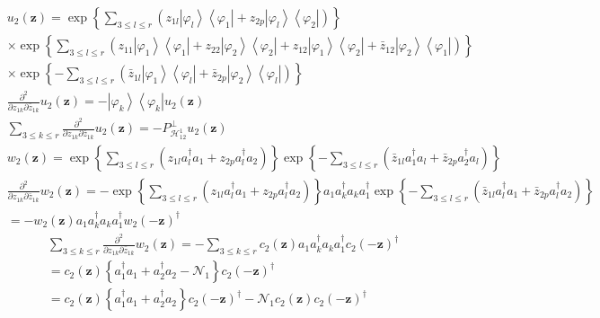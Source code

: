 \documentclass[aps,preprint]{revtex4}%
\begin{document}
\begin{align}
& u_{2}\left(  \mathbf{z}\right)  =\exp\left\{  \sum_{3\leq l\leq r}\left(
z_{1l}\left\vert \varphi_{l}\right\rangle \left\langle \varphi_{1}\right\vert
+z_{2p}\left\vert \varphi_{l}\right\rangle \left\langle \varphi_{2}\right\vert
\right)  \right\}  \\
& \times\exp\left\{  \sum_{3\leq l\leq r}\left(  z_{11}\left\vert \varphi
_{1}\right\rangle \left\langle \varphi_{1}\right\vert +z_{22}\left\vert
\varphi_{2}\right\rangle \left\langle \varphi_{2}\right\vert +z_{12}\left\vert
\varphi_{1}\right\rangle \left\langle \varphi_{2}\right\vert +\bar{z}%
_{12}\left\vert \varphi_{2}\right\rangle \left\langle \varphi_{1}\right\vert
\right)  \right\}  \\
& \times\exp\left\{  -\sum_{3\leq l\leq r}\left(  \bar{z}_{1l}\left\vert
\varphi_{1}\right\rangle \left\langle \varphi_{l}\right\vert +\bar{z}%
_{2p}\left\vert \varphi_{2}\right\rangle \left\langle \varphi_{l}\right\vert
\right)  \right\}  \\
& \frac{\partial^{2}}{\partial z_{1k}\partial\bar{z}_{1k}}u_{2}\left(
\mathbf{z}\right)  =-\left\vert \varphi_{k}\right\rangle \left\langle
\varphi_{k}\right\vert u_{2}\left(  \mathbf{z}\right)  \\
& \sum_{3\leq k\leq r}\frac{\partial^{2}}{\partial z_{1k}\partial\bar{z}_{1k}%
}u_{2}\left(  \mathbf{z}\right)  =-P_{\mathcal{H}_{12}^{1}}^{\bot}u_{2}\left(
\mathbf{z}\right)
\end{align}%
\begin{align}
& w_{2}\left(  \mathbf{z}\right)  =\exp\left\{  \sum_{3\leq l\leq r}\left(
z_{1l}a_{l}^{\dagger}a_{1}+z_{2p}a_{l}^{\dagger}a_{2}\right)  \right\}
\exp\left\{  -\sum_{3\leq l\leq r}\left(  \bar{z}_{1l}a_{1}^{\dagger}%
a_{l}+\bar{z}_{2p}a_{2}^{\dagger}a_{l}\right)  \right\}  \\
& \frac{\partial^{2}}{\partial z_{1k}\partial\bar{z}_{1k}}w_{2}\left(
\mathbf{z}\right)  =-\exp\left\{  \sum_{3\leq l\leq r}\left(  z_{1l}%
a_{l}^{\dagger}a_{1}+z_{2p}a_{l}^{\dagger}a_{2}\right)  \right\}  a_{1}%
a_{k}^{\dagger}a_{k}a_{1}^{\dagger}\exp\left\{  -\sum_{3\leq l\leq r}\left(
\bar{z}_{1l}a_{l}^{\dagger}a_{1}+\bar{z}_{2p}a_{l}^{\dagger}a_{2}\right)
\right\}  \\
& =-w_{2}\left(  \mathbf{z}\right)  a_{1}a_{k}^{\dagger}a_{k}a_{1}^{\dagger
}w_{2}\left(  -\mathbf{z}\right)  ^{\dagger}%
\end{align}%
\begin{align}
& \sum_{3\leq k\leq r}\frac{\partial^{2}}{\partial z_{1k}\partial\bar{z}_{1k}%
}w_{2}\left(  \mathbf{z}\right)  =-\sum_{3\leq k\leq r}c_{2}\left(
\mathbf{z}\right)  a_{1}a_{k}^{\dagger}a_{k}a_{1}^{\dagger}c_{2}\left(
-\mathbf{z}\right)  ^{\dagger}\\
& =c_{2}\left(  \mathbf{z}\right)  \left\{  a_{1}^{\dagger}a_{1}%
+a_{2}^{\dagger}a_{2}-\mathcal{N}_{1}\right\}  c_{2}\left(  -\mathbf{z}%
\right)  ^{\dagger}\\
& =c_{2}\left(  \mathbf{z}\right)  \left\{  a_{1}^{\dagger}a_{1}%
+a_{2}^{\dagger}a_{2}\right\}  c_{2}\left(  -\mathbf{z}\right)  ^{\dagger
}-\mathcal{N}_{1}c_{2}\left(  \mathbf{z}\right)  c_{2}\left(  -\mathbf{z}%
\right)  ^{\dagger}%
\end{align}%
\end{document}
